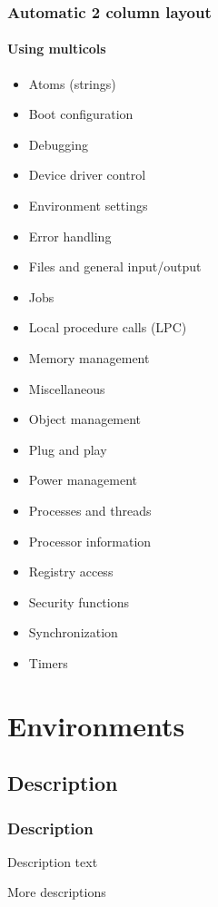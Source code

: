 \documentclass[sans,10pt]{beamer}
\begin{document}
\begin{frame}
\frametitle{Automatic 2 column layout}
\framesubtitle{Using multicols}
\begin{multicols}{2}
\begin{itemize}
\item Atoms (strings)
\item Boot configuration
\item Debugging
\item Device driver control
\item Environment settings
\item Error handling
\item Files and general input/output 
\item Jobs
\item Local procedure calls (LPC)
\item Memory management
\item Miscellaneous
\item Object management
\item Plug and play
\item Power management
\item Processes and threads
\item Processor information
\item Registry access
\item Security functions
\item Synchronization
\item Timers
\end{itemize}
\end{multicols}
\end{frame}

\section{Environments}

\expandedtoc{}


\subsection{Description}
\begin{frame}
\frametitle{Description}
\begin{description}
\item[Key] Description text
\item[Longest Key] More descriptions
\end{description}
\end{frame}
\end{document}
